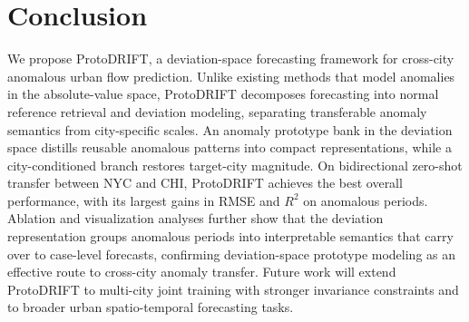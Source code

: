 \section{Conclusion}

We propose ProtoDRIFT, a deviation-space forecasting framework for cross-city anomalous urban flow prediction. Unlike existing methods that model anomalies in the absolute-value space, ProtoDRIFT decomposes forecasting into normal reference retrieval and deviation modeling, separating transferable anomaly semantics from city-specific scales. An anomaly prototype bank in the deviation space distills reusable anomalous patterns into compact representations, while a city-conditioned branch restores target-city magnitude. On bidirectional zero-shot transfer between NYC and CHI, ProtoDRIFT achieves the best overall performance, with its largest gains in RMSE and $R^2$ on anomalous periods. Ablation and visualization analyses further show that the deviation representation groups anomalous periods into interpretable semantics that carry over to case-level forecasts, confirming deviation-space prototype modeling as an effective route to cross-city anomaly transfer. Future work will extend ProtoDRIFT to multi-city joint training with stronger invariance constraints and to broader urban spatio-temporal forecasting tasks.